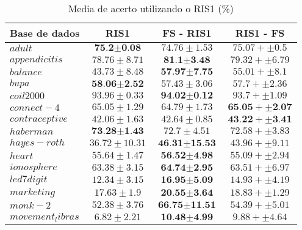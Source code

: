 \documentclass[a4paper, 12pt]{article}
\begin{document}
\begin{table}[h!]
  \begin{center}
    \caption{Media de acerto utilizando o RIS1 (\%)}
    \label{tab:table1}
    \begin{tabular}{l|c|c|c}
      \textbf{Base de dados} & \textbf{ RIS1 } & \textbf{FS - RIS1} & \textbf{RIS1 - FS}\\
        \hline
        $adult$ & $\textbf{75.2} \pm \textbf{0.08}$  & $74.76 \pm 1.53$ & $75.07 +  \pm 0.5$ \\
        \hline
        $appendicitis$ & $78.76 \pm 8.71$  & $\textbf{81.1} \pm \textbf{3.48}$ & $79.32 +  \pm 6.79$ \\
        \hline
        $balance$ & $43.73 \pm 8.48$  & $\textbf{57.97} \pm \textbf{7.75}$ & $55.01 +  \pm 8.1$ \\
        \hline
        $bupa$ & $\textbf{58.06} \pm \textbf{2.52}$  & $57.43 \pm 3.06$ & $57.7 +  \pm 2.36$ \\
        \hline
        $coil2000$ & $93.96 \pm 0.33$  & $\textbf{94.02} \pm \textbf{0.12}$ & $93.7 +  \pm 1.09$ \\
        \hline
        $connect-4$ & $65.05 \pm 1.29$  & $64.79 \pm 1.73$ & $\textbf{65.05} +  \pm \textbf{2.07}$ \\
        \hline
        $contraceptive$ & $42.06 \pm 1.63$  & $42.64 \pm 0.85$ & $\textbf{43.22} +  \pm \textbf{3.41}$ \\
        \hline
        $haberman$ & $\textbf{73.28} \pm \textbf{1.43}$  & $72.7 \pm 4.51$ & $72.58 +  \pm 3.83$ \\
        \hline
        $hayes-roth$ & $36.72 \pm 10.31$  & $\textbf{46.31} \pm \textbf{15.53}$ & $43.96 +  \pm 9.11$ \\
        \hline
        $heart$ & $55.64 \pm 1.47$  & $\textbf{56.52} \pm \textbf{4.98}$ & $55.09 +  \pm 2.94$ \\
        \hline
        $ionosphere$ & $63.38 \pm 3.15$  & $\textbf{64.74} \pm \textbf{2.95}$ & $63.51 +  \pm 6.97$ \\
        \hline
        $led7digit$ & $12.34 \pm 3.15$  & $\textbf{16.95} \pm \textbf{5.09}$ & $14.93 +  \pm 4.19$ \\
        \hline
        $marketing$ & $17.63 \pm 1.9$  & $\textbf{20.55} \pm \textbf{3.64}$ & $18.83 +  \pm 1.29$ \\
        \hline
        $monk-2$ & $52.38 \pm 3.76$  & $\textbf{66.75} \pm \textbf{11.51}$ & $54.39 +  \pm 5.01$ \\
        \hline
        $movement_libras$ & $6.82 \pm 2.21$  & $\textbf{10.48} \pm \textbf{4.99}$ & $9.88 +  \pm 4.64$ \\

\end{tabular}
\end{center}
\end{table}
\end{document}
